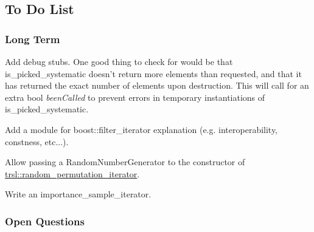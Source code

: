 \hypertarget{group__todo}{
\subsection{To Do List}
\label{group__todo}
}
\hypertarget{group__todo_todo_long_term}{}\subsubsection{Long Term}\label{group__todo_todo_long_term}

\begin{DoxyItemize}
\item Add debug stubs. One good thing to check for would be that is\_\-picked\_\-systematic doesn't return more elements than requested, and that it has returned the exact number of elements upon destruction. This will call for an extra bool {\itshape beenCalled\/} to prevent errors in temporary instantiations of is\_\-picked\_\-systematic.
\end{DoxyItemize}


\begin{DoxyItemize}
\item Add a module for boost::filter\_\-iterator explanation (e.g. interoperability, constness, etc...).
\end{DoxyItemize}


\begin{DoxyItemize}
\item Allow passing a RandomNumberGenerator to the constructor of \hyperlink{namespacetrsl_afb566791dfade70af49beaa5b816e7ee}{trsl::random\_\-permutation\_\-iterator}.
\end{DoxyItemize}


\begin{DoxyItemize}
\item Write an importance\_\-sample\_\-iterator.
\end{DoxyItemize}\hypertarget{group__todo_todo_open_questions}{}\subsubsection{Open Questions}\label{group__todo_todo_open_questions}
